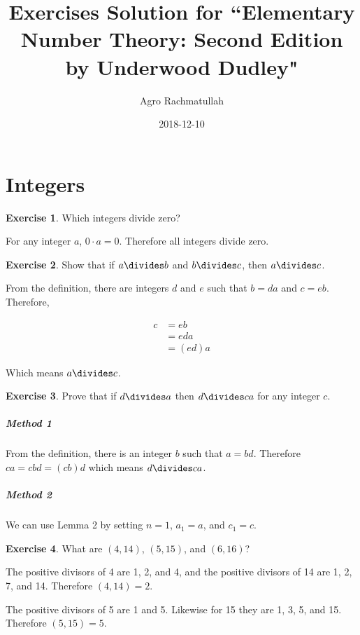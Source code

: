 \documentclass{article}
\title{Exercises Solution for ``Elementary Number Theory: Second Edition by Underwood Dudley"}
\date{2018-12-10}
\author{Agro Rachmatullah}
\theoremstyle{definition}
\newtheorem{exercise}{Exercise}
\begin{document}
  \maketitle
  
  \newpage
  \section{Integers}
  
  \begin{exercise}
    Which integers divide zero?
  \end{exercise}
  
  For any integer $a$, $0 \cdot a = 0$. Therefore all integers divide zero.
  
  \begin{exercise}
    Show that if $a \divides b$ and $b \divides c$, then $a \divides c$.
  \end{exercise}
  
  From the definition, there are integers $d$ and $e$ such that $b = da$ and $c = eb$.
  Therefore,
  
  \begin{align*}
  c &= eb \\
     &= eda \\
     &= (ed)a
  \end{align*}
  
  Which means $a \divides c$.
  
  \begin{exercise}
    Prove that if $d \divides a$ then $d \divides ca$ for any integer $c$.
  \end{exercise}
  
  \subparagraph{Method 1} From the definition, there is an integer $b$ such that $a = bd$. Therefore $ca = cbd = (cb)d$
  which means $d \divides ca$.
  
  \subparagraph{Method 2} We can use Lemma 2 by setting $n = 1$, $a_1 = a$, and $c_1 = c$.
  
  \begin{exercise}
    What are $(4, 14)$, $(5, 15)$, and $(6, 16)$?
  \end{exercise}
  
  The positive divisors of 4 are 1, 2, and 4, and the positive divisors of 14 are 1, 2, 7, and 14. Therefore $(4, 14) = 2$.
  
  The positive divisors of 5 are 1 and 5. Likewise for 15 they are 1, 3, 5, and 15. Therefore $(5, 15) = 5$.
  
\end{document}
